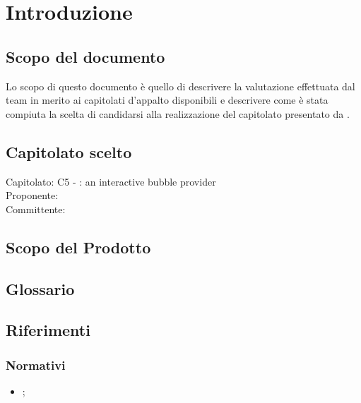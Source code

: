 \section{Introduzione}

\subsection{Scopo del documento}
Lo scopo di questo documento è quello di descrivere la valutazione effettuata dal team in merito ai capitolati d'appalto disponibili e descrivere come è stata compiuta la scelta di candidarsi alla realizzazione del capitolato \ProjectName{} presentato da \Proponente. 

\subsection{Capitolato scelto}
Capitolato: C5 - \ProjectName{}: an interactive bubble provider\\
Proponente: \Proponente{} \\
Committente: \CommittenteInline{} \\

\subsection{Scopo del Prodotto}
\ScopoDelProdotto

\subsection{Glossario}
\GlossarioIntroduzione

\subsection{Riferimenti}
\subsubsection{Normativi}
\begin{itemize}
	\item \textbf{\NormeDiProgetto};
\end{itemize}

